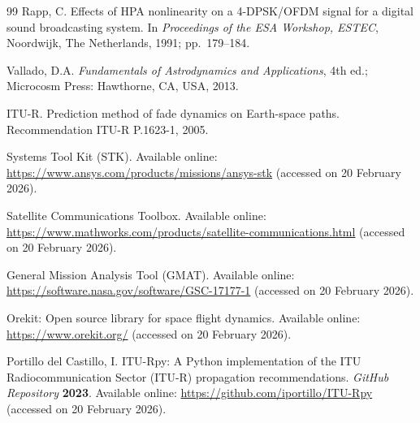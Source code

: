 \documentclass[telecom,article,submit,pdftex,moreauthors]{Definitions/mdpi}
\begin{document}
\begin{thebibliography}{99}
Rapp, C. Effects of HPA nonlinearity on a 4-DPSK/OFDM signal for a digital sound broadcasting system. In \textit{Proceedings of the ESA Workshop, ESTEC}, Noordwijk, The Netherlands, 1991; pp.~179--184.

Vallado, D.A. \textit{Fundamentals of Astrodynamics and Applications}, 4th ed.; Microcosm Press: Hawthorne, CA, USA, 2013.

ITU-R. Prediction method of fade dynamics on Earth-space paths. Recommendation ITU-R P.1623-1, 2005.

Systems Tool Kit (STK). Available online: \url{https://www.ansys.com/products/missions/ansys-stk} (accessed on 20 February 2026).

Satellite Communications Toolbox. Available online: \url{https://www.mathworks.com/products/satellite-communications.html} (accessed on 20 February 2026).

General Mission Analysis Tool (GMAT). Available online: \url{https://software.nasa.gov/software/GSC-17177-1} (accessed on 20 February 2026).

Orekit: Open source library for space flight dynamics. Available online: \url{https://www.orekit.org/} (accessed on 20 February 2026).

Portillo del Castillo, I. ITU-Rpy: A Python implementation of the ITU Radiocommunication Sector (ITU-R) propagation recommendations. \textit{GitHub Repository} \textbf{2023}. Available online: \url{https://github.com/iportillo/ITU-Rpy} (accessed on 20 February 2026).

\end{thebibliography}
\end{document}
